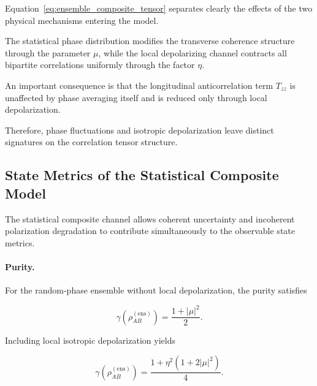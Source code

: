 Equation~\eqref{eq:ensemble_composite_tensor} separates clearly the effects of the two physical mechanisms entering the model.

\medskip

The statistical phase distribution modifies the transverse coherence structure through the parameter \( \mu \), while the local depolarizing channel contracts all bipartite correlations uniformly through the factor \( \eta \).

\medskip

An important consequence is that the longitudinal anticorrelation term \( T_{zz} \) is unaffected by phase averaging itself and is reduced only through local depolarization.

\medskip

Therefore, phase fluctuations and isotropic depolarization leave distinct signatures on the correlation tensor structure.

\medskip


\subsection{State Metrics of the Statistical Composite Model}

The statistical composite channel allows coherent uncertainty and incoherent polarization degradation to contribute simultaneously to the observable state metrics.

\medskip

\paragraph{Purity.}

For the random-phase ensemble without local depolarization, the purity satisfies

\[
\gamma
\left(
\rho_{AB}^{(\mathrm{ens})}
\right)
=
\frac{1+|\mu|^2}{2}.
\]

Including local isotropic depolarization yields

\begin{equation}
\gamma
\left(
\rho_{AB}^{(\mathrm{ens})}
\right)
=
\frac{1+\eta^2\left(1+2|\mu|^2\right)}{4}.
\label{eq:ensemble_composite_purity}
\end{equation}

\medskip

